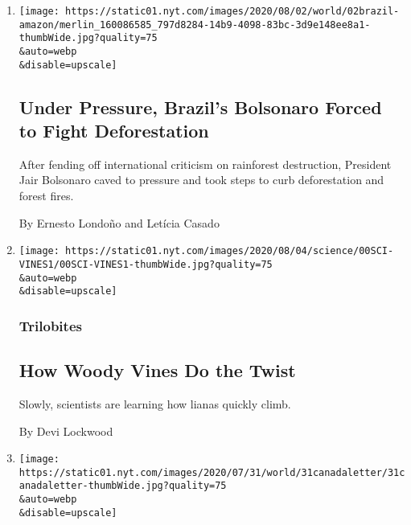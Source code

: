 \begin{enumerate}
\def\labelenumi{\arabic{enumi}.}
\item
  \href{/2020/08/01/world/americas/Brazil-amazon-deforestation-bolsonaro.html}{}

  \texttt{[image: https://static01.nyt.com/images/2020/08/02/world/02brazil-amazon/merlin\_160086585\_797d8284-14b9-4098-83bc-3d9e148ee8a1-thumbWide.jpg?quality=75\\\&auto=webp\\\&disable=upscale]}

  \hypertarget{under-pressure-brazils-bolsonaro-forced-to-fight-deforestation}{%
  \subsection{Under Pressure, Brazil's Bolsonaro Forced to Fight
  Deforestation}\label{under-pressure-brazils-bolsonaro-forced-to-fight-deforestation}}

  After fending off international criticism on rainforest destruction,
  President Jair Bolsonaro caved to pressure and took steps to curb
  deforestation and forest fires.

  By Ernesto Londoño and Letícia Casado
\item
  \href{/2020/08/01/science/vines-lianas-panama.html}{}

  \texttt{[image: https://static01.nyt.com/images/2020/08/04/science/00SCI-VINES1/00SCI-VINES1-thumbWide.jpg?quality=75\\\&auto=webp\\\&disable=upscale]}

  \hypertarget{trilobites}{%
  \subsubsection{Trilobites}\label{trilobites}}

  \hypertarget{how-woody-vines-do-the-twist}{%
  \subsection{How Woody Vines Do the
  Twist}\label{how-woody-vines-do-the-twist}}

  Slowly, scientists are learning how lianas quickly climb.

  By Devi Lockwood
\item
  \href{/2020/07/31/world/canada/leone-farrell-chemist.html}{}

  \texttt{[image: https://static01.nyt.com/images/2020/07/31/world/31canadaletter/31canadaletter-thumbWide.jpg?quality=75\\\&auto=webp\\\&disable=upscale]}

  \hypertarget{canada-letter}{%
}
\end{enumerate}
